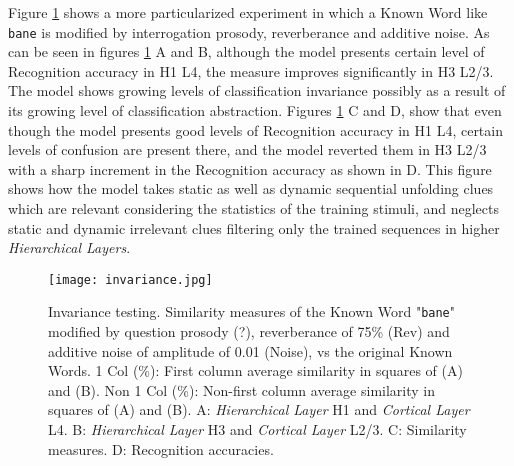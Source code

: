 \documentclass[11pt,a4paper]{article}
\begin{document}
Figure \ref{fig:invariance} shows a more particularized experiment
in which a Known Word like \texttt{bane} is modified by
interrogation prosody, reverberance and additive noise.
As can be seen in figures \ref{fig:invariance} A and B,
although the model presents certain level of Recognition
accuracy in H1 L4, the measure improves significantly
in H3 L2/3.
The model shows growing levels of classification invariance
possibly as a result of its growing level of classification
abstraction.
Figures \ref{fig:invariance} C and D, show that even though
the model presents good levels of Recognition accuracy in H1 L4,
certain levels of confusion are present there, and the model
reverted them in H3 L2/3 with a sharp increment in the
Recognition accuracy as shown in D.
This figure shows how the model takes static as well as
dynamic sequential unfolding clues which are relevant
considering the statistics of the training stimuli, and neglects
static and dynamic irrelevant clues filtering only the
trained sequences in higher \textit{Hierarchical Layers}.\\

\begin{figure}[h]
\centering
\texttt{[image: invariance.jpg]}
\caption{\scriptsize{Invariance testing.
Similarity measures of the Known Word "\texttt{bane}" modified by question prosody (?),
reverberance of 75\% (Rev) and additive noise of amplitude of 0.01 (Noise),
vs the original Known Words.
1 Col (\%): First column average similarity in squares of (A) and (B).
Non 1 Col (\%): Non-first column average similarity in squares of (A) and (B).
A: \textit{Hierarchical Layer} H1 and \textit{Cortical Layer} L4.
B: \textit{Hierarchical Layer} H3 and \textit{Cortical Layer} L2/3.
C: Similarity measures.
D: Recognition accuracies.}}
\label{fig:invariance}
\end{figure}
\end{document}
